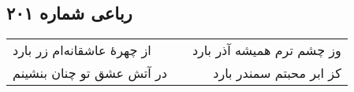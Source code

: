 \begin{center}
\section*{رباعی شماره ۲۰۱}
\label{sec:sh201}
\begin{longtable}{l p{0.5cm} r}
از چهرهٔ عاشقانه‌ام زر بارد
&&
وز چشم ترم همیشه آذر بارد
\\
در آتش عشق تو چنان بنشینم
&&
کز ابر محبتم سمندر بارد
\\
\end{longtable}
\end{center}

